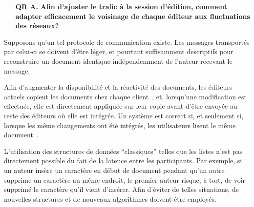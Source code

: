 \begin{itemize}
  \begin{itemize}
  \item [\textbf{QR A.}] \textbf{Afin d'ajuster le trafic à la session
      d'édition, comment adapter efficacement le voisinage de chaque éditeur
      aux fluctuations des réseaux?}
  \end{itemize}

  Supposons qu'un tel protocole de communication existe. Les messages
  transportés par celui-ci se doivent d'être léger, et pourtant suffisamment
  descriptifs pour reconstruire un document identique indépendemment de l'auteur
  recevant le message.

  Afin d'augmenter la disponibilité et la réactivité des documents, les éditeurs
  actuels copient les documents chez chaque client~\cite{saito2005optimistic},
  et, lorsqu'une modification est effectuée, elle est directement appliquée sur
  leur copie avant d'être envoyée au reste des éditeurs où elle est intégrée. Un
  système est correct si, et seulement si, lorsque les même changements ont été
  intégrés, les utilisateurs lisent le même
  document~\cite{burckhardt2014replicated, shapiro2011conflict}.

  L'utilisation des structures de données ``classiques'' telles que les listes
  n'est pas directement possible du fait de la latence entre les
  participants. Par exemple, si un auteur insère un caractère en début de
  document pendant qu'un autre supprime un caractère au même endroit, le premier
  auteur risque, à tort, de voir supprimé le caractère qu'il vient
  d'insérer. Afin d'éviter de telles situations, de nouvelles structures et de
  nouveaux algorithmes doivent être employés.


\end{itemize}
